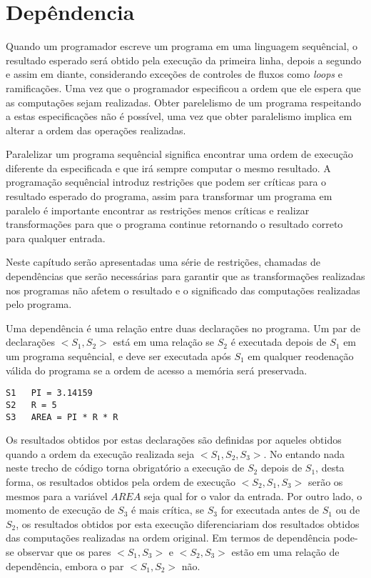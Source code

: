 
\chapter{Depêndencia}

Quando um programador escreve um programa em uma linguagem sequêncial, o
resultado esperado será obtido pela execução da primeira linha, depois a segundo
e assim em diante, considerando exceções de controles de fluxos como
\textit{loops} e ramificações. 
Uma vez que o programador especificou a ordem que ele espera que as computações 
sejam realizadas. 
Obter parelelismo de um programa respeitando a estas especificações não é
possível, uma vez que obter paralelismo implica em alterar a ordem das
operações realizadas.

Paralelizar um programa sequêncial significa encontrar uma ordem de execução
diferente da especificada e que irá sempre computar o mesmo resultado.
A programação sequêncial introduz restrições que podem ser críticas para o
resultado esperado do programa, assim para transformar um programa em paralelo é
importante encontrar as restrições menos críticas e realizar transformações para
que o programa continue retornando o resultado correto para qualquer entrada.

Neste capítudo serão apresentadas uma série de restrições, chamadas de
dependências que serão necessárias para garantir que as transformações
realizadas nos programas não afetem o resultado e o significado das computações
realizadas pelo programa.

Uma dependência é uma relação entre duas declarações no programa. 
Um par de declarações $<S_1,S_2>$ está em uma relação se $S_2$ é executada 
depois de $S_1$ em um programa sequêncial, e deve ser executada após $S_1$ 
em qualquer reodenação válida do programa se a ordem de acesso a 
memória será preservada.

\begin{verbatim}
S1   PI = 3.14159
S2   R = 5 
S3   AREA = PI * R * R
\end{verbatim}

Os resultados obtidos por estas declarações são definidas por aqueles obtidos
quando a ordem da execução realizada seja $<S_1,S_2,S_3>$. 
No entando nada neste trecho de código torna obrigatório a execução de 
$S_2$ depois de $S_1$, desta forma, os resultados obtidos pela ordem de execução 
$<S_2,S_1,S_3>$ serão os mesmos para a variável $AREA$ seja qual for o valor 
da entrada.
Por outro lado, o momento de execução de $S_3$ é mais crítica, se $S_3$ for
executada antes de $S_1$ ou de $S_2$, os resultados obtidos por esta execução
diferenciariam dos resultados obtidos das computações realizadas na ordem
original.
Em termos de dependência pode-se observar que os pares $<S_1,S_3>$ e $<S_2,S_3>$
estão em uma relação de dependência, embora o par $<S_1,S_2>$ não.

